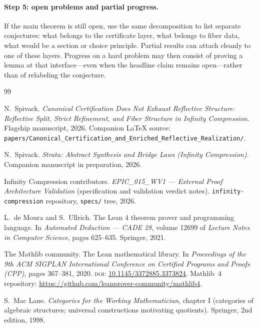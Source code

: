 \documentclass[11pt]{article}
\begin{document}
\paragraph{Step 5: open problems and partial progress.}
If the main theorem is still open, use the same decomposition to list separate conjectures:
what belongs to the certificate layer, what belongs to fiber data, what would be a section or
choice principle. Partial results can attach cleanly to one of these layers. Progress on a
hard problem may then consist of proving a lemma at that interface---even when the headline
claim remains open---rather than of relabeling the conjecture.

\begin{thebibliography}{99}

N.~Spivack.
\newblock \emph{Canonical Certification Does Not Exhaust Reflective Structure: Reflective Split, Strict Refinement, and Fiber Structure in Infinity Compression}.
\newblock Flagship manuscript, 2026.
\newblock Companion \LaTeX{} source: \texttt{papers/Canonical\_Certification\_and\_Enriched\_Reflective\_Realization/}.

N.~Spivack.
\newblock \emph{Strata: Abstract Synthesis and Bridge Laws (Infinity Compression)}.
\newblock Companion manuscript in preparation, 2026.

Infinity Compression contributors.
\newblock \emph{EPIC\_015\_WV1 --- External Proof Architecture Validation} (specification and validation verdict notes).
\newblock \texttt{infinity-compression} repository, \texttt{specs/} tree, 2026.

L.~de Moura and S.~Ullrich.
\newblock The Lean 4 theorem prover and programming language.
\newblock In \emph{Automated Deduction --- CADE 28}, volume 12699 of \emph{Lecture Notes in Computer Science}, pages 625--635. Springer, 2021.

The Mathlib community.
\newblock The Lean mathematical library.
\newblock In \emph{Proceedings of the 9th ACM SIGPLAN International Conference on Certified Programs and Proofs (CPP)}, pages 367--381, 2020.
\newblock \textsc{doi}: \href{https://doi.org/10.1145/3372885.3373824}{10.1145/3372885.3373824}.
\newblock Mathlib~4 repository: \url{https://github.com/leanprover-community/mathlib4}.

S.~Mac Lane.
\newblock \emph{Categories for the Working Mathematician}, chapter I (categories of algebraic structures; universal constructions motivating quotients).
\newblock Springer, 2nd edition, 1998.


\end{thebibliography}
\end{document}
